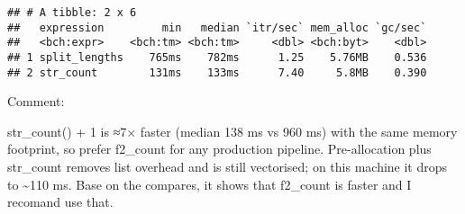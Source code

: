 \documentclass[
]{article}
\newenvironment{Shaded}{\begin{snugshade}}{\end{snugshade}}
\newcommand{\AttributeTok}[1]{\textcolor[rgb]{0.13,0.29,0.53}{#1}}
\newcommand{\CommentTok}[1]{\textcolor[rgb]{0.56,0.35,0.01}{\textit{#1}}}
\newcommand{\ConstantTok}[1]{\textcolor[rgb]{0.56,0.35,0.01}{#1}}
\newcommand{\ControlFlowTok}[1]{\textcolor[rgb]{0.13,0.29,0.53}{\textbf{#1}}}
\newcommand{\DecValTok}[1]{\textcolor[rgb]{0.00,0.00,0.81}{#1}}
\newcommand{\FunctionTok}[1]{\textcolor[rgb]{0.13,0.29,0.53}{\textbf{#1}}}
\newcommand{\NormalTok}[1]{#1}
\newcommand{\OtherTok}[1]{\textcolor[rgb]{0.56,0.35,0.01}{#1}}
\newcommand{\SpecialCharTok}[1]{\textcolor[rgb]{0.81,0.36,0.00}{\textbf{#1}}}
\newcommand{\StringTok}[1]{\textcolor[rgb]{0.31,0.60,0.02}{#1}}
\begin{document}
\begin{Shaded}
\end{Shaded}

\begin{verbatim}
## # A tibble: 2 x 6
##   expression         min   median `itr/sec` mem_alloc `gc/sec`
##   <bch:expr>    <bch:tm> <bch:tm>     <dbl> <bch:byt>    <dbl>
## 1 split_lengths    765ms    782ms      1.25    5.76MB    0.536
## 2 str_count        131ms    133ms      7.40     5.8MB    0.390
\end{verbatim}

Comment:

str\_count() + 1 is ≈7× faster (median 138 ms vs 960 ms) with the same
memory footprint, so prefer f2\_count for any production pipeline.
Pre-allocation plus str\_count removes list overhead and is still
vectorised; on this machine it drops to \textasciitilde110 ms. Base on
the compares, it shows that f2\_count is faster and I recomand use that.
\end{document}
